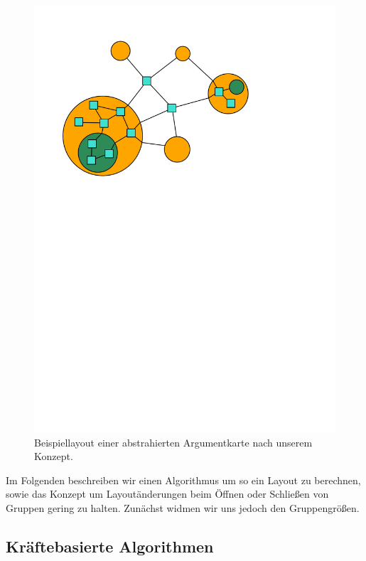 \begin{figure}[h!]
\begin{center} 
  \includegraphics{Pics/Layoutbeispiel.pdf}
  \caption{Beispiellayout einer abstrahierten Argumentkarte nach unserem Konzept.}
  \label{f:Layoutbeispiel}
\end{center}
\end{figure}

Im Folgenden beschreiben wir einen Algorithmus um so ein Layout zu berechnen, 
sowie das Konzept um Layoutänderungen beim Öffnen oder Schließen von Gruppen gering zu halten.
Zunächst widmen wir uns jedoch den Gruppengrößen. 


\subsection*{Kräftebasierte Algorithmen}

